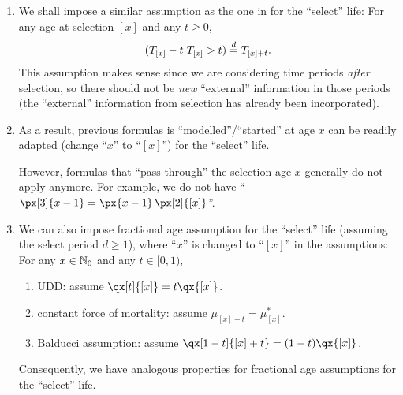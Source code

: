 \begin{enumerate}
\item We shall impose a similar assumption as the one in
 for the ``select'' life: For any age at selection
\([x]\) and any \(t\ge 0\),
\[
(T_{[x]}-t|T_{[x]}>t)\overset{d}= T_{[x]+t}.
\]
This assumption makes sense since we are considering time periods \emph{after}
selection, so there should not be \emph{new} ``external'' information in those
periods (the ``external'' information from selection has already been
incorporated).
\item As a result, previous formulas is ``modelled''/``started'' at age \(x\)
can be readily adapted (change ``\(x\)'' to ``\([x]\)'') for the ``select''
life.
\begin{warning}
However, formulas that ``pass through'' the selection age \(x\) generally do
not apply anymore. For example, we do \underline{not} have
``\(\px[3]{x-1}=\px{x-1}\,\px[2]{[x]}\)''.
\end{warning}
\item We can also impose fractional age assumption for the ``select'' life
(assuming the select period \(d\ge 1\)), where ``\(x\)'' is changed to
``\([x]\)'' in the assumptions: For any \(x\in\mathbb{N}_0\) and any \(t\in[0,1)\),
\begin{enumerate}
\item UDD:  assume \(\qx[t]{[x]}=t\qx{[x]}\).
\item constant force of mortality:  assume \(\mu_{[x]+t}=\mu_{[x]}^{*}\).
\item Balducci assumption:  assume \(\qx[1-t]{[x]+t}=(1-t)\qx{[x]}\).
\end{enumerate}
Consequently, we have analogous properties for fractional age assumptions for
the ``select'' life.
\end{enumerate}

